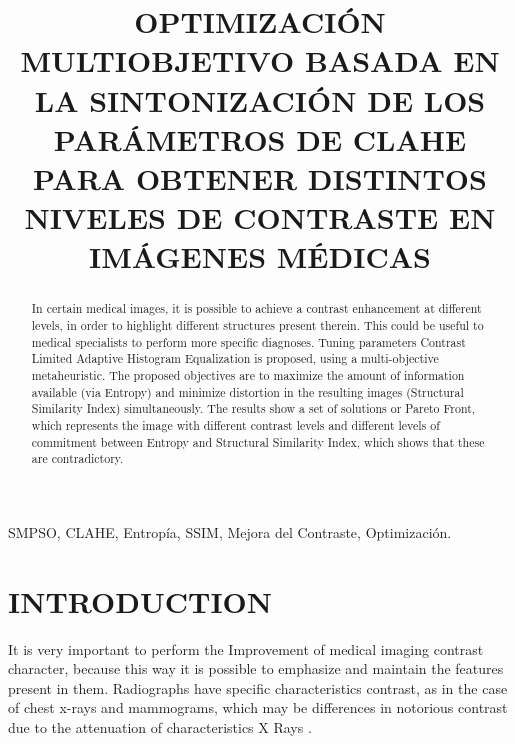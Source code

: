 \documentclass[spanish,twocolumn]{article}
\title{OPTIMIZACIÓN MULTIOBJETIVO BASADA EN LA SINTONIZACIÓN DE LOS PARÁMETROS DE CLAHE PARA OBTENER DISTINTOS NIVELES DE CONTRASTE EN IMÁGENES MÉDICAS}
\begin{document}
%
\maketitle
%
\begin{abstract}
In certain medical images, it is possible to achieve a contrast enhancement at different levels, in order to highlight different structures present therein. This could be useful to medical specialists to perform more specific diagnoses. Tuning parameters Contrast Limited Adaptive Histogram Equalization is proposed, using a multi-objective metaheuristic. The proposed objectives are to maximize the amount of information available (via Entropy) and minimize distortion in the resulting images (Structural Similarity Index) simultaneously. The results show a set of solutions or Pareto Front, which represents the image with different contrast levels and different levels of commitment between Entropy and Structural Similarity Index, which shows that these are contradictory.
\end{abstract}
%
\begin{keywords}
SMPSO, CLAHE, Entropía, SSIM, Mejora del Contraste, Optimización.
\end{keywords}
%
\section{INTRODUCTION}
\label{sec:intro}

It is very important to perform the Improvement of medical imaging contrast character, because this way it is possible to emphasize and maintain the features present in them. Radiographs have specific characteristics contrast, as in the case of chest x-rays and mammograms, which may be differences in notorious contrast due to the attenuation of characteristics X Rays \cite{chang1998image}.
\end{document}
